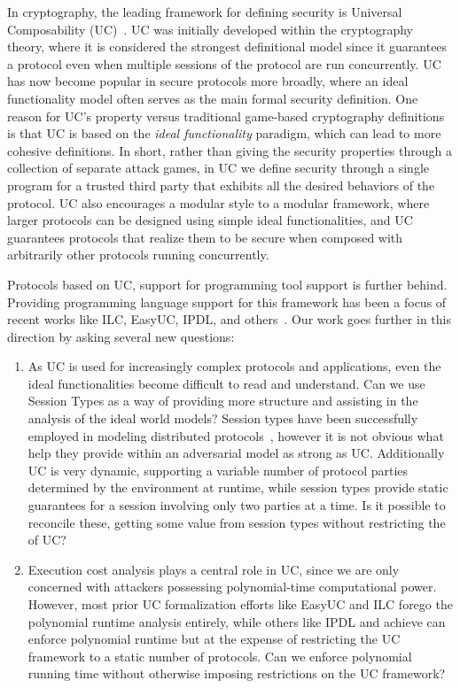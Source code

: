 In cryptography, the leading framework for defining security is Universal Composability (UC)~\cite{canettiUC}.
UC was initially developed within the cryptography theory, where it is considered the strongest definitional model since it guarantees a protocol even when multiple sessions of the protocol are run concurrently. UC has now become popular in secure protocols more broadly, where an ideal functionality model often serves as the main formal security definition.
One reason for UC's property versus traditional game-based cryptography definitions is that UC is based on the \emph{ideal functionality} paradigm, which can lead to more cohesive definitions. In short, rather than giving the security properties through a collection of separate attack games, in UC we define security through a single program for a trusted third party that exhibits all the desired behaviors of the protocol.
UC also encourages a modular style  to a modular framework, where larger protocols can be designed using simple ideal functionalities, and UC guarantees protocols that realize them to be secure when composed with arbitrarily other protocols running concurrently.

Protocols based on UC, support for programming tool support is further behind. Providing programming language support for this framework has been a focus of recent works like ILC, EasyUC, IPDL, and others~\cite{ilc, easyuc, ipdl, sybolicuc, barbosa}. Our work goes further in this direction by asking several new questions:

\begin{enumerate}
\item 
As UC is used for increasingly complex protocols and applications, even the ideal functionalities become difficult to read and understand.
Can we use Session Types as a way of providing more structure and assisting in the analysis of the ideal world models?
Session types have been successfully employed in modeling distributed protocols~\cite{nomos}, however it is not obvious what help they provide within an adversarial model as strong as UC.
Additionally UC is very dynamic, supporting a variable number of protocol parties determined by the environment at runtime, while session types provide static guarantees for a session involving only two parties at a time.
Is it possible to reconcile these, getting some value from session types without restricting the  of UC?

\item Execution cost analysis plays a central role in UC, since we are only concerned with
attackers possessing polynomial-time computational power.
However, most prior UC formalization efforts like EasyUC and ILC forego the polynomial runtime analysis entirely, while others like IPDL and  achieve can enforce polynomial runtime but at the expense of restricting the UC framework to a static number of protocols.
Can we enforce polynomial running time without otherwise imposing restrictions on the UC framework?

\end{enumerate}

